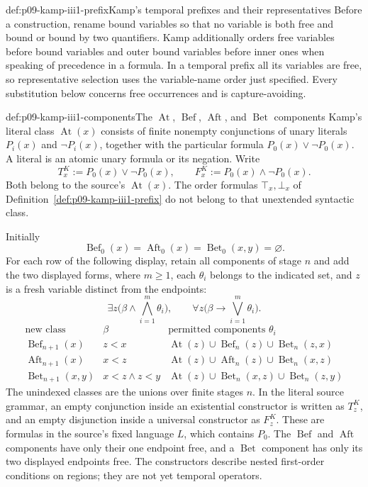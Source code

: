\begin{hbdefinition}{def:p09-kamp-iii1-prefix}{Kamp's temporal prefixes and their representatives}
Before a construction, rename bound variables so that no variable is both
free and bound or bound by two quantifiers.  Kamp additionally orders free
variables before bound variables and outer bound variables before inner
ones when speaking of precedence in a formula.  In a temporal prefix all
its variables are free, so representative selection uses the variable-name
order just specified.  Every substitution below concerns free occurrences
and is capture-avoiding.
\end{hbdefinition}

\begin{hbdefinition}{def:p09-kamp-iii1-components}{The \(\operatorname{At}\), \(\operatorname{Bef}\), \(\operatorname{Aft}\), and \(\operatorname{Bet}\) components}
Kamp's literal class \(\operatorname{At}(x)\) consists of finite nonempty
conjunctions of unary literals \(P_i(x)\) and \(\neg P_i(x)\), together
with the particular formula \(P_0(x)\lor\neg P_0(x)\).
A literal is an atomic unary formula or its negation.  Write
\[
 T^K_x:=P_0(x)\lor\neg P_0(x),\qquad
 F^K_x:=P_0(x)\land\neg P_0(x).
\]
Both belong to the source's \(\operatorname{At}(x)\).  The order formulas
\(\top_x,\bot_x\) of Definition~\ref{def:p09-kamp-iii1-prefix} do not
belong to that unextended syntactic class.

Initially
\[
 \operatorname{Bef}_0(x)=\operatorname{Aft}_0(x)
 =\operatorname{Bet}_0(x,y)=\varnothing.
\]
For each row of the following display, retain all components of stage \(n\)
and add the two displayed forms, where \(m\geq1\), each \(\theta_i\)
belongs to the indicated set, and \(z\) is a fresh variable distinct from
the endpoints:
\[
 \exists z\bigl(\beta\land\bigwedge_{i=1}^{m}\theta_i\bigr),
 \qquad
 \forall z\bigl(\beta\longrightarrow\bigvee_{i=1}^{m}\theta_i\bigr).
\]
\[
\begin{array}{c|c|l}
 \text{new class}&\beta&\text{permitted components }\theta_i\\ \hline
 \operatorname{Bef}_{n+1}(x)&z<x&
 \operatorname{At}(z)\cup\operatorname{Bef}_n(z)
                    \cup\operatorname{Bet}_n(z,x)\\
 \operatorname{Aft}_{n+1}(x)&x<z&
 \operatorname{At}(z)\cup\operatorname{Aft}_n(z)
                    \cup\operatorname{Bet}_n(x,z)\\
 \operatorname{Bet}_{n+1}(x,y)&x<z\land z<y&
 \operatorname{At}(z)\cup\operatorname{Bet}_n(x,z)
                    \cup\operatorname{Bet}_n(z,y)
\end{array}
\]
The unindexed classes are the unions over finite stages \(n\).
In the literal source grammar, an empty conjunction inside an existential
constructor is written as \(T^K_z\), and an empty disjunction inside a
universal constructor as \(F^K_z\).  These are formulas in the source's
fixed language \(L\), which contains \(P_0\).
The \(\operatorname{Bef}\) and \(\operatorname{Aft}\) components have only
their one endpoint free, and a \(\operatorname{Bet}\) component has only
its two displayed endpoints free.  The constructors describe nested
first-order conditions on regions; they are not yet temporal operators.


\end{hbdefinition}
